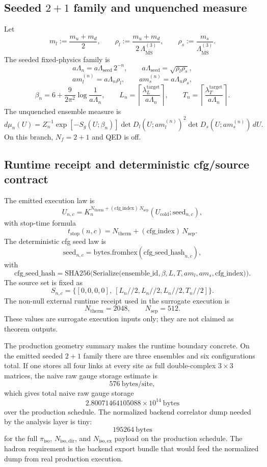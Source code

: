 \documentclass[11pt]{article}
\begin{document}
\subsection{Seeded \(2+1\) family and unquenched measure}

Let
\[
m_l := \frac{m_u+m_d}{2},
\qquad
\rho_l := \frac{m_u+m_d}{2\,\Lambda_{\overline{\mathrm{MS}}}^{(3)}},
\qquad
\rho_s := \frac{m_s}{\Lambda_{\overline{\mathrm{MS}}}^{(3)}}.
\]
The seeded fixed-physics family is
\[
a\Lambda_n = a\Lambda_{\mathrm{seed}}\,2^{-n},
\qquad
a\Lambda_{\mathrm{seed}} = \sqrt{\rho_l \rho_s},
\]
\[
a m_l^{(n)} = a\Lambda_n \rho_l,
\qquad
a m_s^{(n)} = a\Lambda_n \rho_s,
\]
\[
\beta_n = 6 + \frac{9}{2\pi^2}\log\!\frac{1}{a\Lambda_n},
\qquad
L_n = \left\lceil \frac{\lambda_L^{\mathrm{target}}}{a\Lambda_n}\right\rceil,
\qquad
T_n = \left\lceil \frac{\lambda_T^{\mathrm{target}}}{a\Lambda_n}\right\rceil.
\]
The unquenched ensemble measure is
\[
d\mu_n(U)
=
Z_n^{-1}
\exp[-S_g(U;\beta_n)]
\det D_l(U; a m_l^{(n)})^2
\det D_s(U; a m_s^{(n)})
\,dU.
\]
On this branch, \(N_f=2+1\) and QED is off.

\subsection{Runtime receipt and deterministic cfg/source contract}

The emitted execution law is
\[
U_{n,c}
=
K_n^{N_{\mathrm{therm}} + (\mathrm{cfg\_index})\,N_{\mathrm{sep}}}(U_{\mathrm{cold}}; \mathrm{seed}_{n,c}),
\]
with stop-time formula
\[
t_{\mathrm{stop}}(n,c)
=
N_{\mathrm{therm}} + (\mathrm{cfg\_index})\,N_{\mathrm{sep}}.
\]
The deterministic cfg seed law is
\[
\mathrm{seed}_{n,c}
=
\mathrm{bytes.fromhex}(\mathrm{cfg\_seed\_hash}_{n,c}),
\]
with
\[
\mathrm{cfg\_seed\_hash}
=
\mathrm{SHA256}\!\Big(
\mathrm{Serialize}\!\big(
\mathrm{ensemble\_id},\beta,L,T,a m_l,a m_s,\mathrm{cfg\_index}
\big)
\Big).
\]
The source set is fixed as
\[
S_{n,c} = \{ [0,0,0,0],\ [L_n//2, L_n//2, L_n//2, T_n//2] \}.
\]
The non-null external runtime receipt used in the surrogate execution is
\[
N_{\mathrm{therm}} = 2048,
\qquad
N_{\mathrm{sep}} = 512.
\]
These values are surrogate execution inputs only; they are not claimed as theorem outputs.

The production geometry summary makes the runtime boundary concrete. On the emitted
seeded \(2+1\) family there are three ensembles and six configurations total. If one stores all
four links at every site as full double-complex \(3\times 3\) matrices, the naive raw gauge
storage estimate is
\[
576\ \mathrm{bytes/site},
\]
which gives total naive raw gauge storage
\[
2.80071464105088\times 10^{14}\ \mathrm{bytes}
\]
over the production schedule. The normalized backend correlator dump needed by the
analysis layer is tiny:
\[
195264\ \mathrm{bytes}
\]
for the full \(\pi_{\mathrm{iso}}\), \(N_{\mathrm{iso,dir}}\), and \(N_{\mathrm{iso,ex}}\)
payload on the production schedule. The hadron requirement is the backend export bundle
that would feed the normalized dump from real production execution.
\end{document}
